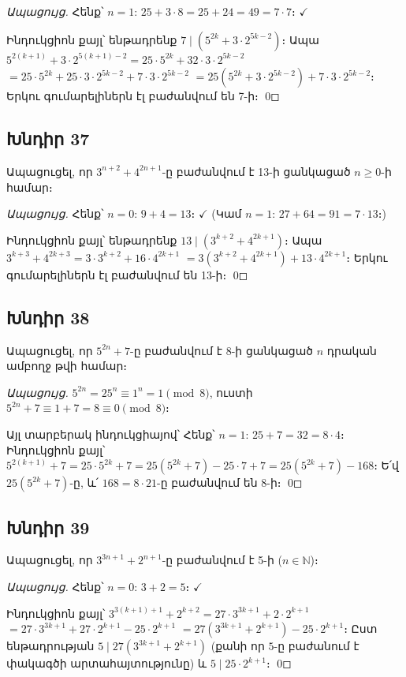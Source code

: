 \textit{Ապացույց.} Հենք՝ $n=1$: $25 + 3 \cdot 8 = 25 + 24 = 49 = 7 \cdot 7$։ $\checkmark$

Ինդուկցիոն քայլ՝ ենթադրենք $7 \mid (5^{2k} + 3 \cdot 2^{5k-2})$։ Ապա
$5^{2(k+1)} + 3 \cdot 2^{5(k+1)-2} = 25 \cdot 5^{2k} + 32 \cdot 3 \cdot 2^{5k-2}$
$= 25 \cdot 5^{2k} + 25 \cdot 3 \cdot 2^{5k-2} + 7 \cdot 3 \cdot 2^{5k-2}$
$= 25(5^{2k} + 3 \cdot 2^{5k-2}) + 7 \cdot 3 \cdot 2^{5k-2}$։
Երկու գումարելիներն էլ բաժանվում են 7-ի։ \qed

\subsection*{Խնդիր 37}
Ապացուցել, որ $3^{n+2} + 4^{2n+1}$-ը բաժանվում է 13-ի ցանկացած $n \ge 0$-ի համար։

\textit{Ապացույց.} Հենք՝ $n=0$: $9 + 4 = 13$։ $\checkmark$ (Կամ $n=1$: $27 + 64 = 91 = 7 \cdot 13$։)

Ինդուկցիոն քայլ՝ ենթադրենք $13 \mid (3^{k+2} + 4^{2k+1})$։ Ապա
$3^{k+3} + 4^{2k+3} = 3 \cdot 3^{k+2} + 16 \cdot 4^{2k+1}$
$= 3(3^{k+2} + 4^{2k+1}) + 13 \cdot 4^{2k+1}$։
Երկու գումարելիներն էլ բաժանվում են 13-ի։ \qed

\subsection*{Խնդիր 38}
Ապացուցել, որ $5^{2n} + 7$-ը բաժանվում է 8-ի ցանկացած $n$ դրական ամբողջ թվի համար։

\textit{Ապացույց.} $5^{2n} = 25^n \equiv 1^n = 1 \pmod{8}$, ուստի $5^{2n} + 7 \equiv 1 + 7 = 8 \equiv 0 \pmod{8}$։

Այլ տարբերակ ինդուկցիայով՝ Հենք՝ $n=1$: $25 + 7 = 32 = 8 \cdot 4$։
Ինդուկցիոն քայլ՝ $5^{2(k+1)} + 7 = 25 \cdot 5^{2k} + 7 = 25(5^{2k}+7) - 25 \cdot 7 + 7 = 25(5^{2k}+7) - 168$։
Ե՛վ $25(5^{2k}+7)$-ը, և՛ $168 = 8 \cdot 21$-ը բաժանվում են 8-ի։ \qed

\subsection*{Խնդիր 39}
Ապացուցել, որ $3^{3n+1} + 2^{n+1}$-ը բաժանվում է 5-ի ($n \in \mathbb{N}$)։

\textit{Ապացույց.} Հենք՝ $n=0$: $3 + 2 = 5$։ $\checkmark$

Ինդուկցիոն քայլ՝ $3^{3(k+1)+1} + 2^{k+2} = 27 \cdot 3^{3k+1} + 2 \cdot 2^{k+1}$
$= 27 \cdot 3^{3k+1} + 27 \cdot 2^{k+1} - 25 \cdot 2^{k+1}$
$= 27(3^{3k+1} + 2^{k+1}) - 25 \cdot 2^{k+1}$։
Ըստ ենթադրության $5 \mid 27(3^{3k+1} + 2^{k+1})$ (քանի որ $5$-ը բաժանում է փակագծի արտահայտությունը) և $5 \mid 25 \cdot 2^{k+1}$։ \qed

